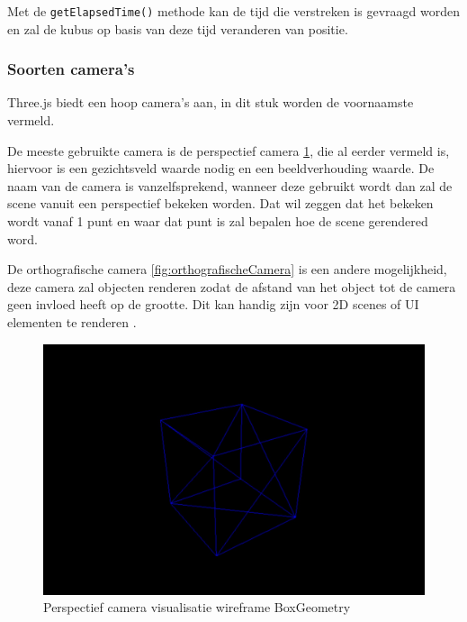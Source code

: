 Met de \texttt{getElapsedTime()} methode kan de tijd die verstreken is gevraagd worden en zal de kubus op basis van deze tijd veranderen van positie. 

\subsubsection{Soorten camera's}

Three.js biedt een hoop camera's aan, in dit stuk worden de voornaamste vermeld.

De meeste gebruikte camera is de perspectief camera \ref{fig:perspectiefCamera}, die al eerder vermeld is, hiervoor is een gezichtsveld waarde nodig en een beeldverhouding waarde. De naam van de camera is vanzelfsprekend, wanneer deze gebruikt wordt dan zal de scene vanuit een perspectief bekeken worden. Dat wil zeggen dat het bekeken wordt vanaf 1 punt en waar dat punt is zal bepalen hoe de scene gerendered word.

De orthografische camera \ref{fig:orthografischeCamera} is een andere mogelijkheid, deze camera zal objecten renderen zodat de afstand van het object tot de camera geen invloed heeft op de grootte. Dit kan handig zijn voor 2D scenes of UI elementen te renderen \autocite{threejs2023}.

\begin{figure}[h]
	\centering
	\includegraphics[width=1\linewidth]{graphics/perspectiefCamera}
	\caption[Perspectief camera visualisatie]{Perspectief camera visualisatie wireframe BoxGeometry}
	\label{fig:perspectiefCamera}
\end{figure}

